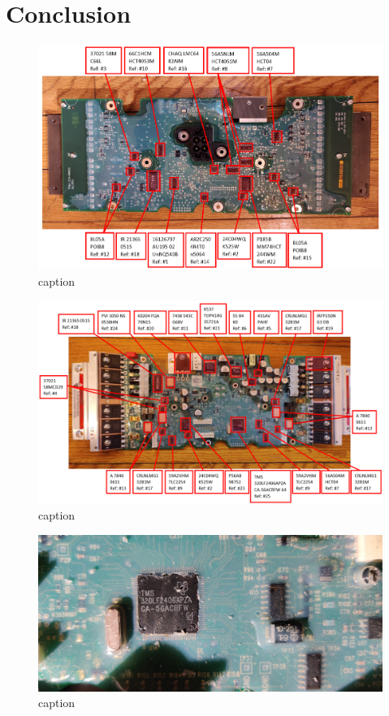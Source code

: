 \documentclass[]{formalLabReport}
\begin{document}
\section{Conclusion} 

\begin{figure}
    \includegraphics[]{annotatedBoardBack.png}
    \caption{caption}
    \label{fig:annotatedBoardBack.png}
\end{figure}

\begin{figure}
    \includegraphics[]{annotatedBoardFront.png}
    \caption{caption}
    \label{fig:annotatedBoardFront.png}
\end{figure}

\begin{figure}
    \includegraphics[]{chipImg-320LF2406APZA.jpg}
    \caption{caption}
    \label{fig:chipImg-320LF2406APZA.jpg}
\end{figure}
\end{document}
